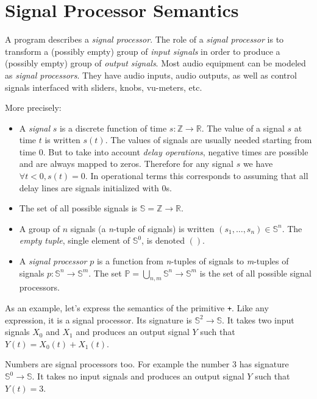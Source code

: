 \section{Signal Processor Semantics}
A \faust program describes a \emph{signal processor}. 
The role of a \textit{signal processor} is to transform a (possibly empty) group of \emph{input signals} in order to produce a (possibly empty) group of \emph{output signals}. 
Most audio equipment can be modeled as \emph{signal processors}. 
They have audio inputs, audio outputs, as well as control signals interfaced with sliders, knobs, vu-meters, etc. 

More precisely:

\begin{itemize}

\item A \emph{signal} $s$ is a discrete function of time $s:\mathbb{Z}\rightarrow\mathbb{R}$.
The value of a signal $s$ at time $t$ is written $s(t)$. The values of signals are usually needed starting from time $0$. But to take into account \emph{delay operations}, negative times are possible and are always mapped to zeros. Therefore for any \faust signal $s$ we have $\forall t<0, s(t)=0$. In operational terms this corresponds to assuming that all delay lines are signals initialized with $0$s.
 
\item The set of all possible signals is $\mathbb{S}=\mathbb{Z}\rightarrow\mathbb{R}$.

\item A group of $n$ signals (a \emph{n}-tuple of signals) is written
$(s_{1},\ldots,s_{n})\in \mathbb{S}^{n}$.
The \emph{empty tuple}, single element of $\mathbb{S}^{0}$, is denoted $()$.

\item A \emph{signal processor} $p$ is a function from
\emph{n}-tuples of signals to \emph{m}-tuples of signals
$p:\mathbb{S}^{n}\rightarrow\mathbb{S}^{m}$. The set $\mathbb{P}=\bigcup_{n,m}\mathbb{S}^{n}\rightarrow\mathbb{S}^{m}$ is the
set of all possible signal processors.

\end{itemize}

As an example, let's express the semantics of the \faust primitive \lstinline'+'. Like any \faust expression, it is a signal processor. Its signature is $\mathbb{S}^{2}\rightarrow\mathbb{S}$. It takes two input signals $X_0$ and $X_1$ and produces an output signal $Y$ such that $Y(t) = X_0(t)+X_1(t)$. 

Numbers are signal processors too. For example the number $3$ has signature $\mathbb{S}^{0}\rightarrow\mathbb{S}$. It takes no input signals and produces an output signal $Y$ such that $Y(t) = 3$. 
